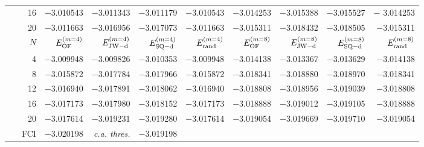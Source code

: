 \documentclass[journal=jctcce,manuscript=article]{achemso}
\begin{document}
\begin{table}[!ht]
\begin{tabular*}{\columnwidth}{@{\extracolsep{\fill}}*{1}{r}*{8}{r}@{}}
  16    &    $-$3.010543	  &    $-$3.011343   &   $-$3.011179   &   $-$3.010543   &    $-$3.014253   &    $-$3.015388   &   $-$3.015527    &   $-$ 3.014253  \\
  20    &    $-$3.011663    &    $-$3.016956   &   $-$3.017073   &    $-$3.011663  &    $-$3.015311   &    $-$3.018432   &    $-$3.018505   &    $-$3.015311  \\
\hline
\toprule
  $N$    &     $E^{(m=4)}_{\rm{OF}}$    &   $E^{(m=4)}_{\rm{JW-d}}$    &   $E^{(m=4)}_{\rm{SQ-d}}$   &   $E^{(m=4)}_{\rm{rand}}$   &     $E^{(m=8)}_{\rm{OF}}$    &   $E^{(m=8)}_{\rm{JW-d}}$    &   $E^{(m=8)}_{\rm{SQ-d}}$   &   $E^{(m=8)}_{\rm{rand}}$   \\
  \midrule
  4      &   $-$3.009948   &    $-$3.009826    &    $-$3.010353   &   $-$3.009948      &   $-$3.014138    &   $-$3.013367    &   $-$3.013629    &   $-$3.014138  \\
  8      &   $-$3.015872   &    $-$3.017784    &    $-$3.017966   &   $-$3.015872      &   $-$3.018341    &   $-$3.018880    &   $-$3.018970    &   $-$3.018341  \\
  12    &   $-$3.016940   &    $-$3.017891    &   $-$3.018062    &   $-$3.016940      &   $-$3.018808    &   $-$3.018956    &   $-$3.019039    &   $-$3.018808  \\
  16    &   $-$3.017173   &    $-$3.017980    &   $-$3.018152    &   $-$3.017173      &   $-$3.018888    &   $-$3.019012    &   $-$3.019105    &   $-$3.018888  \\ 
  20    &    $-$3.017614  &    $-$3.019231    &   $-$3.019280    &   $-$3.017614     &    $-$3.019054   &    $-$3.019669   &    $-$3.019710     &    $-$3.019054   \\[3pt]
~~~FCI       &  $-$3.020198    &   \textit{c.a. thres.}      &    $-$3.019198    \\%
\bottomrule
\hline
\end{tabular*}
\label{h6_gse_table}
\end{table}
\end{document}
